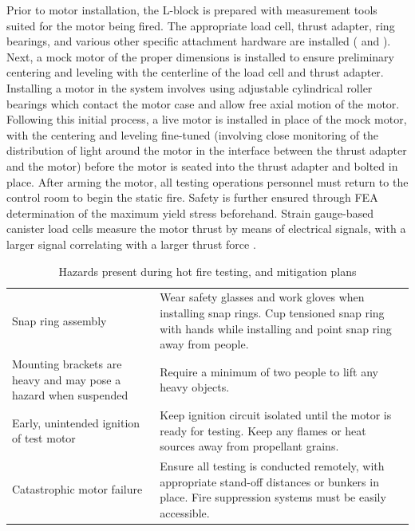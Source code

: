 Prior to motor installation, the L-block is prepared with measurement tools suited for the motor being fired. The appropriate load cell, thrust adapter, ring bearings, and various other specific attachment hardware are installed ( and ). Next, a mock motor of the proper dimensions is installed to ensure preliminary centering and leveling with the centerline of the load cell and thrust adapter. Installing a motor in the system involves using adjustable cylindrical roller bearings which contact the motor case and allow free axial motion of the motor. Following this initial process, a live motor is installed in place of the mock motor, with the centering and leveling fine-tuned (involving close monitoring of the distribution of light around the motor in the interface between the thrust adapter and the motor) before the motor is seated into the thrust adapter and bolted in place. After arming the motor, all testing operations personnel must return to the control room to begin the static fire. Safety is further ensured through FEA determination of the maximum yield stress beforehand. Strain gauge-based canister load cells measure the motor thrust by means of electrical signals, with a larger signal correlating with a larger thrust force \cite{uah-thesis}.

\begin{table}
    \centering

    \begin{longtable}{|>{\raggedright\arraybackslash}p{5.75cm}|>{\raggedright\arraybackslash}p{8.75cm}|}
        \hline
        \multicolumn{1}{|c|}{\textbf{Hazard}} & \multicolumn{1}{c|}{\textbf{Mitigation}} \\ \hline
        Snap ring assembly & Wear safety glasses and work gloves when installing snap rings. Cup tensioned snap ring with hands while installing and point snap ring away from people. \\ \hline
        Mounting brackets are heavy and may pose a hazard when suspended & Require a minimum of two people to lift any heavy objects. \\ \hline
        Early, unintended ignition of test motor & Keep ignition circuit isolated until the motor is ready for testing. Keep any flames or heat sources away from propellant grains. \\ \hline
        Catastrophic motor failure & Ensure all testing is conducted remotely, with appropriate stand-off distances or bunkers in place. Fire suppression systems must be easily accessible. \\ \hline
    \end{longtable}

    \vspace{0.2cm}
    
    \caption{Hazards present during hot fire testing, and mitigation plans}
    \label{table:hotfire-hazards}
\end{table}


